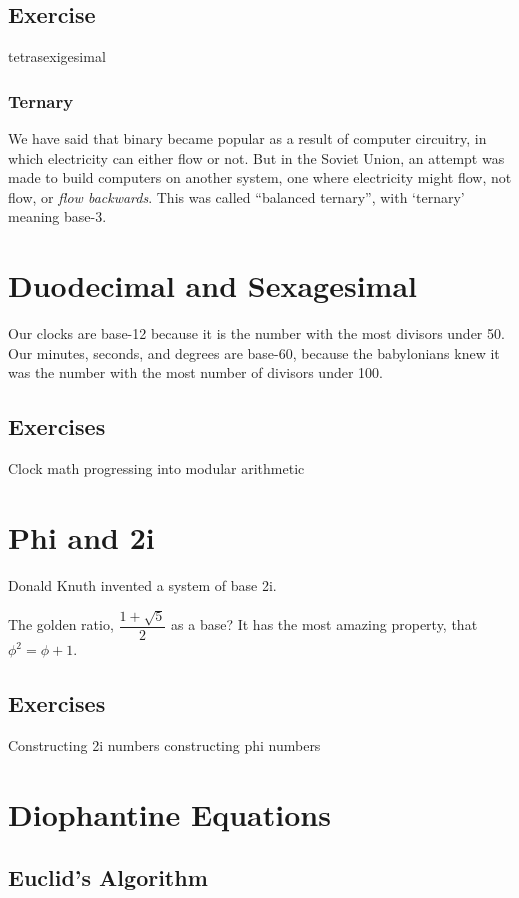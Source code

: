 \subsection{Exercise}
tetrasexigesimal
\subsubsection{Ternary}
We have said that binary became popular as a result of computer circuitry, in which 
electricity can either flow or not.  But in the Soviet Union, an attempt was made to build
computers on another system, one where electricity might flow, not flow, or \emph{flow
backwards}.  This was called ``balanced ternary'', with `ternary' meaning base-3.




\newpage
\section{Duodecimal and Sexagesimal}
Our clocks are base-12 because it is the number with the most divisors under 50.  Our minutes, 
seconds, and degrees are base-60, because the babylonians knew it was the number with the most
number of divisors under 100.
\subsection{Exercises}
Clock math progressing into modular arithmetic



\newpage
\section{Phi and 2i}
Donald Knuth invented a system of base 2i.

The golden ratio, $\dfrac{1+\sqrt{5}}{2}$ as a base?  It has the most amazing property, that $\phi^2
=\phi+1$.
\subsection{Exercises}
Constructing 2i numbers
constructing phi numbers


\newpage
\section{Diophantine Equations}
\subsection{Euclid's Algorithm}
